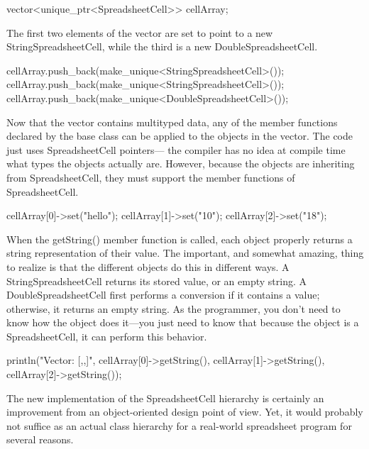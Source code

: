 \begin{cpp}
vector<unique_ptr<SpreadsheetCell>> cellArray;
\end{cpp}

The first two elements of the vector are set to point to a new StringSpreadsheetCell, while the third is a new DoubleSpreadsheetCell.

\begin{cpp}
cellArray.push_back(make_unique<StringSpreadsheetCell>());
cellArray.push_back(make_unique<StringSpreadsheetCell>());
cellArray.push_back(make_unique<DoubleSpreadsheetCell>());
\end{cpp}

Now that the vector contains multityped data, any of the member functions declared by the base class can be applied to the objects in the vector. The code just uses SpreadsheetCell pointers— the compiler has no idea at compile time what types the objects actually are. However, because the objects are inheriting from SpreadsheetCell, they must support the member functions of SpreadsheetCell.

\begin{cpp}
cellArray[0]->set("hello");
cellArray[1]->set("10");
cellArray[2]->set("18");
\end{cpp}

When the getString() member function is called, each object properly returns a string representation of their value. The important, and somewhat amazing, thing to realize is that the different objects do this in different ways. A StringSpreadsheetCell returns its stored value, or an empty string. A DoubleSpreadsheetCell first performs a conversion if it contains a value; otherwise, it returns an empty string. As the programmer, you don’t need to know how the object does it—you just need to know that because the object is a SpreadsheetCell, it can perform this behavior.

\begin{cpp}
println("Vector: [{},{},{}]", cellArray[0]->getString(),
                              cellArray[1]->getString(),
                              cellArray[2]->getString());
\end{cpp}



The new implementation of the SpreadsheetCell hierarchy is certainly an improvement from an object-oriented design point of view. Yet, it would probably not suffice as an actual class hierarchy for a real-world spreadsheet program for several reasons.

